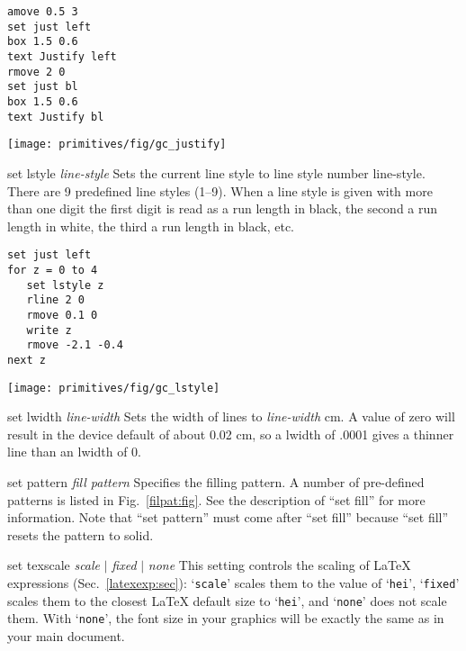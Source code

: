 \begin{commanddescription}
\begin{minipage}[c]{8cm}
\begin{Verbatim}
amove 0.5 3
set just left
box 1.5 0.6
text Justify left
rmove 2 0
set just bl
box 1.5 0.6
text Justify bl
\end{Verbatim}
\end{minipage}
\hfill
\begin{minipage}[c]{7cm}
\mbox{\texttt{[image: primitives/fig/gc\_justify]}}
\end{minipage}

\item[{\sf set lstyle {\it line-style}}]
\label{lstyle:cmd}
Sets the current line style to line style number {\sf line-style}.  There are
9 predefined line styles (1--9).  When a line style is given with more than
one digit the first digit is read as a run length in black,
the second a run length in white, the third a run length in black, etc.

\begin{minipage}[c]{8cm}
\begin{Verbatim}
set just left 
for z = 0 to 4
   set lstyle z
   rline 2 0
   rmove 0.1 0
   write z
   rmove -2.1 -0.4
next z
\end{Verbatim}
\end{minipage}
\hfill
\begin{minipage}[c]{7cm}
\mbox{\texttt{[image: primitives/fig/gc\_lstyle]}}
\end{minipage}

\item[{\sf set lwidth {\it line-width}}]
Sets the width of lines to {\it line-width} cm.  A value of zero will result in
the device default of about 0.02 cm, so a lwidth of .0001 gives
a thinner line than an lwidth of 0.

\item[{\sf set pattern {\it fill pattern}}]
Specifies the filling pattern. A number of pre-defined patterns is listed in Fig.~\ref{filpat:fig}. See the description of ``set fill'' for more information. Note that ``set pattern'' must come after ``set fill'' because ``set fill'' resets the pattern to solid.

\item[{\sf set texscale {\it scale} $|$ {\it fixed} $|$ {\it none}}]
This setting controls the scaling of \LaTeX{} expressions (Sec.~\ref{latexexp:sec}): `\texttt{scale}' scales them to the value of `\texttt{hei}', `\texttt{fixed}' scales them to the closest \LaTeX{} default size to `\texttt{hei}', and `\texttt{none}' does not scale them. With `\texttt{none}', the font size in your graphics will be exactly the same as in your main document.


\end{commanddescription}
